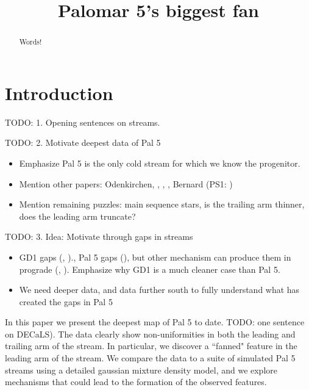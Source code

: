 \documentclass[modern]{aastex62}
\newcommand{\todo}[1]{{\color{red} TODO: #1}}
\begin{document}
\sloppy\sloppypar\raggedbottom\frenchspacing %

\title{Palomar 5's biggest fan}



\begin{abstract}\noindent %
    Words!
\end{abstract}


\section{Introduction}
\label{sec:intro}
\todo{1. Opening sentences on streams}.

\todo{2. Motivate deepest data of Pal 5}
\begin{itemize}
\item  Emphasize Pal 5 is the only cold stream for which we know the progenitor.
\item	 Mention other papers: Odenkirchen, \citet{Ibata:2016}, \citet{Ibata:2017}, \citet{Balbinot:2017}, Bernard (PS1: \citealt{Bernard:2016})
\item	 Mention remaining puzzles: main sequence stars, is the trailing arm thinner, does the leading arm truncate?
\end{itemize}

\todo{3. Idea: Motivate through gaps in streams}
\begin{itemize}
\item	GD1 gaps (\citealt{Price-Whelan:2018}, \citealt{Bonaca:2018b})., Pal 5 gaps (\citealt{Yoon:2011}), but other mechanism can produce them in prograde (\citealt{Amorisco:2016}, \citealt{Pearson:2017}). Emphasize why GD1 is a much cleaner case than Pal 5.
\item	We need deeper data, and data further south to fully understand what has created the gaps in Pal 5
\end{itemize}
	
In this paper we present the deepest map of Pal 5 to date. \todo{one sentence on DECaLS)}. The data clearly show non-uniformities in both the leading and trailing arm of the stream. In particular, we discover a ``fanned" feature in the leading arm of the stream. We compare the data to a suite of simulated Pal 5 streams using a detailed gaussian mixture density model, and we explore mechanisms that could lead to the formation of the observed features.  
\end{document}
